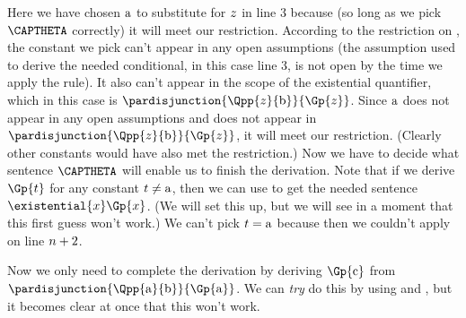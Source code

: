 Here we have chosen $\mathrm{a}$ to substitute for $z$ in line 3 because (so long as we pick $\CAPTHETA$ correctly) it will meet our restriction. 
According to the restriction on , the constant we pick can't appear in any open assumptions (the assumption used to derive the needed conditional, in this case line 3, is not open by the time we apply the rule). 
It also can't appear in the scope of the existential quantifier, which in this case is $\pardisjunction{\Qpp{\variable{z}}{\constant{b}}}{\Gp{\variable{z}}}$. 
Since $\mathrm{a}$ does not appear in any open assumptions and does not appear in $\pardisjunction{\Qpp{\variable{z}}{\constant{b}}}{\Gp{\variable{z}}}$, it will meet our restriction.
(Clearly other constants would have also met the restriction.)
Now we have to decide what sentence $\CAPTHETA$ will enable us to finish the derivation. 
Note that if we derive $\Gp{\variable{t}}$ for any constant $t\neq\mathrm{a}$, then we can use  to get the needed sentence $\existential{\variable{x}}\Gp{\variable{x}}$. 
(We will set this up, but we will see in a moment that this first guess won't work.)
We can't pick $t=\mathrm{a}$ because then we couldn't apply  on line $n+2$.
\begin{gproof}[\label{GQDExampleJ}]
\end{gproof}
Now we only need to complete the derivation by deriving $\Gp{\constant{c}}$ from $\pardisjunction{\Qpp{\constant{a}}{\constant{b}}}{\Gp{\constant{a}}}$. 
We can \emph{try} do this by using  and , but it becomes clear at once that this won't work.
